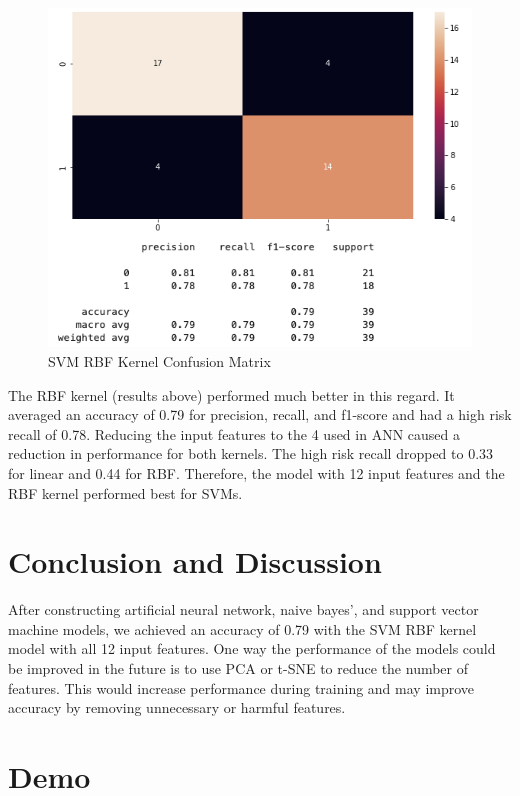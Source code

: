 \documentclass[11pt]{article}
\begin{document}
\begin{figure}[H]
	\centering
	\includegraphics[width=7.5in]{figures/svm_rbf_confusion.png}
	\caption{SVM RBF Kernel Confusion Matrix}\label{fig:figures/svm_rbf_confusion.png}
\end{figure}

{The RBF kernel (results above) performed much better in this regard. It
averaged an accuracy of 0.79 for precision, recall, and f1-score and had
a high risk recall of 0.78. Reducing the input features to the 4 used in
ANN caused a reduction in performance for both kernels. The high risk
recall dropped to 0.33 for linear and 0.44 for RBF. Therefore, the model
with 12 input features and the RBF kernel performed best for SVMs.}

{}

\section{Conclusion and Discussion}

{After constructing artificial neural network, naive bayes', and support
vector machine models, we achieved an accuracy of 0.79 with the SVM RBF
kernel model with all 12 input features. One way the performance of the
models could be improved in the future is to use PCA or t-SNE to reduce
the number of features. This would increase performance during training
and may improve accuracy by removing unnecessary or harmful features. }

{}

\section{Demo}
\end{document}
